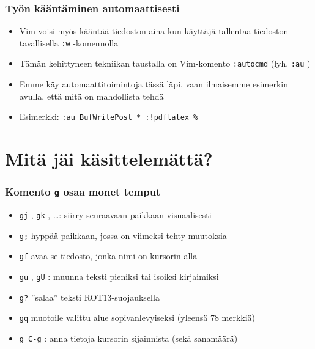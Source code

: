\documentclass[]{beamer}
\newcommand{\Tohj}[1]{\texttt{#1}}
\newcommand{\com}[1]{{\color{blue!50!black}\Tohj{#1}} \!\!}
\begin{document}
\begin{frame}
    \frametitle{Työn kääntäminen automaattisesti}
    \begin{itemize}
        \item Vim voisi myös kääntää tiedoston aina kun käyttäjä tallentaa tiedoston tavallisella \com{:w} -komennolla
        \pause
        \item Tämän kehittyneen tekniikan taustalla on Vim-komento \com{:autocmd} (lyh. \com{:au})
        \item Emme käy automaattitoimintoja tässä läpi, vaan ilmaisemme esimerkin avulla, että mitä on mahdollista tehdä
        \pause
        \item Esimerkki: \com{:au BufWritePost * :!pdflatex \%}
    \end{itemize}
\end{frame}


\section{Mitä jäi käsittelemättä?}

\begin{frame}
    \frametitle{Komento \com{g} osaa monet temput} 
    \begin{itemize}
        \item \com{gj}, \com{gk}, \dots: siirry seuraavaan paikkaan visuaalisesti
        \pause
        \item \com{g;} hyppää paikkaan, jossa on viimeksi tehty muutoksia
        \pause
        \item \com{gf} avaa se tiedosto, jonka nimi on kursorin alla
        \pause
        \item \com{gu}, \com{gU}: muunna teksti pieniksi tai isoiksi kirjaimiksi
        \pause
        \item \com{g?} ''salaa'' teksti ROT13-suojauksella
        \pause
        \item \com{gq} muotoile valittu alue sopivanlevyiseksi (yleensä 78 merkkiä)
        \pause
        \item \com{g C-g}: anna tietoja kursorin sijainnista (sekä sanamäärä)
    \end{itemize}
\end{frame}
\end{document}
